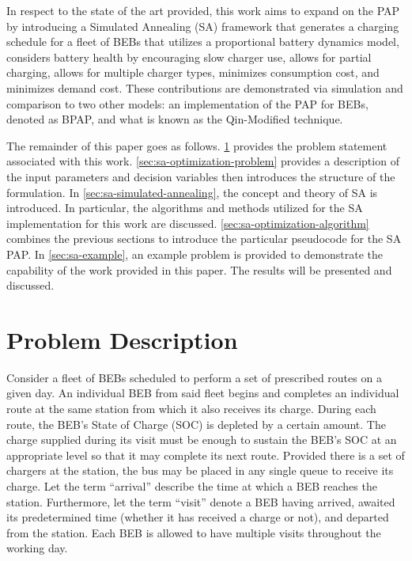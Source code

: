 \documentclass[energies,article,submit,moreauthors]{Definitions/mdpi}
\begin{document}
In respect to the state of the art provided, this work aims to expand on the PAP by introducing a Simulated Annealing
(SA) framework that generates a charging schedule for a fleet of BEBs that utilizes a proportional battery dynamics
model, considers battery health by encouraging slow charger use, allows for partial charging, allows for multiple
charger types, minimizes consumption cost, and minimizes demand cost. These contributions are demonstrated via
simulation and comparison to two other models: an implementation of the PAP for BEBs, denoted as BPAP, and what is known
as the Qin-Modified technique.

The remainder of this paper goes as follows. \ref{sec:sa-problem-description} provides the problem statement associated with
this work. \ref{sec:sa-optimization-problem} provides a description of the input parameters and decision variables then
introduces the structure of the formulation. In \ref{sec:sa-simulated-annealing}, the concept and theory of SA is introduced.
In particular, the algorithms and methods utilized for the SA implementation for this work are discussed.
\ref{sec:sa-optimization-algorithm} combines the previous sections to introduce the particular pseudocode for the SA PAP. In
\ref{sec:sa-example}, an example problem is provided to demonstrate the capability of the work provided in this paper. The
results will be presented and discussed.
\section{Problem Description}
\label{sec:sa-problem-description}
Consider a fleet of BEBs scheduled to perform a set of prescribed routes on a given day. An individual BEB from said
fleet begins and completes an individual route at the same station from which it also receives its charge. During each
route, the BEB's State of Charge (SOC) is depleted by a certain amount. The charge supplied during its visit must be
enough to sustain the BEB's SOC at an appropriate level so that it may complete its next route. Provided there is a set
of chargers at the station, the bus may be placed in any single queue to receive its charge. Let the term ``arrival''
describe the time at which a BEB reaches the station. Furthermore, let the term ``visit'' denote a BEB having arrived,
awaited its predetermined time (whether it has received a charge or not), and departed from the station. Each BEB is
allowed to have multiple visits throughout the working day.
\end{document}
